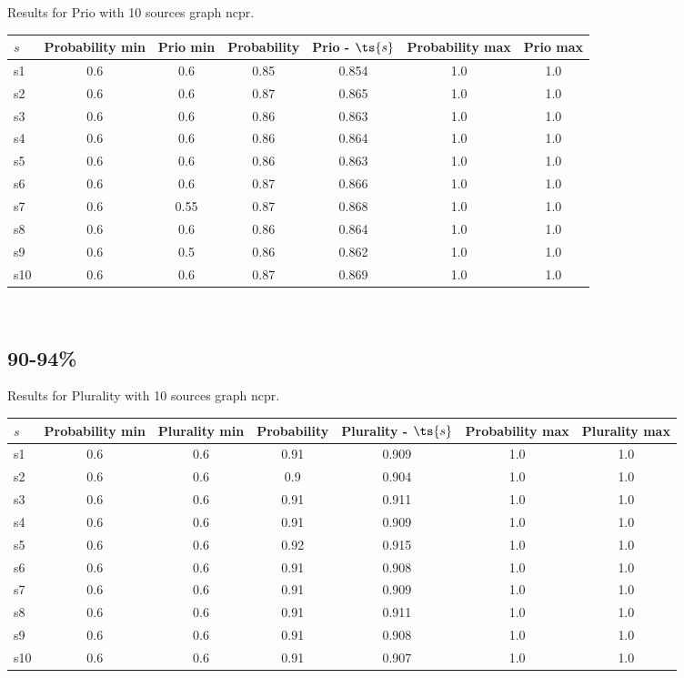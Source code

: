 \documentclass{article}
\begin{document}
\noindent Results for Prio with 10 sources graph ncpr.

\noindent\begin{tabular}{|l|c|c|c|c|c|c|}
\hline
$s$& Probability min & Prio min & Probability & Prio - $\ts{s}$ & Probability max & Prio max\\
\hline
s1 &0.6 & 0.6 & 0.85 & 0.854 & 1.0 & 1.0\\
\hline
s2 &0.6 & 0.6 & 0.87 & 0.865 & 1.0 & 1.0\\
\hline
s3 &0.6 & 0.6 & 0.86 & 0.863 & 1.0 & 1.0\\
\hline
s4 &0.6 & 0.6 & 0.86 & 0.864 & 1.0 & 1.0\\
\hline
s5 &0.6 & 0.6 & 0.86 & 0.863 & 1.0 & 1.0\\
\hline
s6 &0.6 & 0.6 & 0.87 & 0.866 & 1.0 & 1.0\\
\hline
s7 &0.6 & 0.55 & 0.87 & 0.868 & 1.0 & 1.0\\
\hline
s8 &0.6 & 0.6 & 0.86 & 0.864 & 1.0 & 1.0\\
\hline
s9 &0.6 & 0.5 & 0.86 & 0.862 & 1.0 & 1.0\\
\hline
s10 &0.6 & 0.6 & 0.87 & 0.869 & 1.0 & 1.0\\
\hline
\end{tabular}\\

\newpage

\subsection{90-94\%}

\noindent Results for Plurality with 10 sources graph ncpr.

\noindent\begin{tabular}{|l|c|c|c|c|c|c|}
\hline
$s$& Probability min & Plurality min & Probability & Plurality - $\ts{s}$ & Probability max & Plurality max\\
\hline
s1 &0.6 & 0.6 & 0.91 & 0.909 & 1.0 & 1.0\\
\hline
s2 &0.6 & 0.6 & 0.9 & 0.904 & 1.0 & 1.0\\
\hline
s3 &0.6 & 0.6 & 0.91 & 0.911 & 1.0 & 1.0\\
\hline
s4 &0.6 & 0.6 & 0.91 & 0.909 & 1.0 & 1.0\\
\hline
s5 &0.6 & 0.6 & 0.92 & 0.915 & 1.0 & 1.0\\
\hline
s6 &0.6 & 0.6 & 0.91 & 0.908 & 1.0 & 1.0\\
\hline
s7 &0.6 & 0.6 & 0.91 & 0.909 & 1.0 & 1.0\\
\hline
s8 &0.6 & 0.6 & 0.91 & 0.911 & 1.0 & 1.0\\
\hline
s9 &0.6 & 0.6 & 0.91 & 0.908 & 1.0 & 1.0\\
\hline
s10 &0.6 & 0.6 & 0.91 & 0.907 & 1.0 & 1.0\\
\hline
\end{tabular}\\
\end{document}
